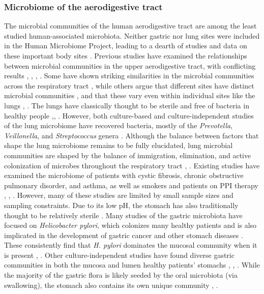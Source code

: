 \documentclass[12pt]{article}
\begin{document}
\subsubsection{Microbiome of the aerodigestive tract}
The microbial communities of the human aerodigestive tract are among the least 
studied human-associated microbiota. 
Neither gastric nor lung sites were included in the 
Human Microbiome Project, leading to a dearth of studies and data on 
these important body sites \cite{bassis-source-2015}. Previous studies have examined the relationships between microbial communities in  the upper 
aerodigestive tract, with conflicting results \cite{bassis-source-2015}, \cite{rosen-ppi-2015}, \cite{charslon-topographical-2011}, \cite{almomani-cf_sputum-2016}. 
Some have shown striking similarities in the microbial
communities across the respiratory tract \cite{almomani-cf_sputum-2016}, \cite{bassis-source-2015} while others
argue that different sites have distinct microbial communities \cite{rosen-ppi-2015},
and that these vary even within individual sites like the lungs \cite{erbdownward-copd-2011}, \cite{dickson-spatial-2015}. The lungs have classically thought to be sterile and free of bacteria in 
healthy people \cite{charslon-topographical-2011},\cite{bassis-source-2015}, \cite{beck-lung-2012}. 
However, both culture-based
and culture-independent studies of the lung microbiome have recovered
bacteria, mostly of the \textit{Prevotella}, \textit{Veillonella}, and \textit{Streptococcus} genera \cite{bassis-source-2015}. 
Although the balance between factors that shape the lung microbiome 
remains to be fully elucidated, lung microbial communities are shaped by the balance of
immigration, elimination, and active colonization of microbes 
throughout the respiratory tract \cite{bassis-source-2015}, \cite{dickson-lung_microbiome-2014}.
Existing studies have examined the microbiome of patients with cystic fibrosis, chronic obstructive 
pulmonary disorder, and asthma, as well as smokers and patients on PPI therapy \cite{almomani-cf_sputum-2016}, \cite{erbdownward-copd-2011}, \cite{rosen-ppi-2015}.
However, many of these studies are limited by small sample sizes and sampling constraints. Due to its low pH, the stomach has also traditionally thought to be
relatively sterile \cite{lawson-gastric-2010}.
Many studies of the gastric microbiota have focused on \textit{Helicobacter pylori}, 
which colonizes many healthy patients and is also implicated in the development of gastric cancer and other stomach diseases \cite{bik-stomach-2006}.
These consistently find that \textit{H. pylori} dominates the mucosal 
community when it is present \cite{bik-stomach-2006}, \cite{lawson-gastric-2010}.
Other culture-independent studies have found diverse gastric communities in 
both the mucosa and lumen healthy patients' stomachs \cite{bassis-source-2015}, \cite{rosen-ppi-2015}, \cite{lawson-gastric-2010}.
While the majority of the gastric flora is likely seeded by the
oral microbiota (via swallowing), 
the stomach also contains its own unique community \cite{bassis-source-2015}, \cite{lawson-gastric-2010}.
\end{document}
